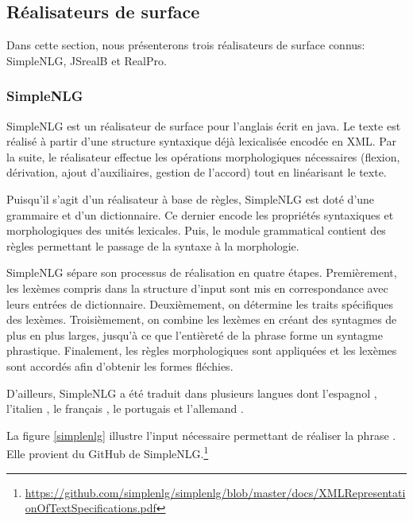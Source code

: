 
\subsection{Réalisateurs de surface}

Dans cette section, nous présenterons trois réalisateurs de surface connus: SimpleNLG, JSrealB et RealPro.

\subsubsection{SimpleNLG}
SimpleNLG \citep{GattSimpleNLGRealisationEngine2009} est un réalisateur de surface pour l'anglais écrit en java. Le texte est réalisé à partir d'une structure syntaxique déjà lexicalisée encodée en XML. Par la suite, le réalisateur effectue les opérations morphologiques nécessaires (flexion, dérivation, ajout d'auxiliaires, gestion de l'accord) tout en linéarisant le texte.

Puisqu'il s'agit d'un réalisateur à base de règles, SimpleNLG est doté d'une grammaire et d'un dictionnaire. Ce dernier encode les propriétés syntaxiques et morphologiques des unités lexicales. Puis, le module grammatical contient des règles permettant le passage de la syntaxe à la morphologie.

SimpleNLG sépare son processus de réalisation en quatre étapes. Premièrement, les lexèmes compris dans la structure d'input sont mis en correspondance avec leurs entrées de dictionnaire. Deuxièmement, on détermine les traits spécifiques des lexèmes. Troisièmement, on combine les lexèmes en créant des syntagmes de plus en plus larges, jusqu'à ce que l'entièreté de la phrase forme un syntagme phrastique. Finalement, les règles morphologiques sont appliquées et les lexèmes sont accordés afin d'obtenir les formes fléchies.

D'ailleurs, SimpleNLG a été traduit dans plusieurs langues dont l'espagnol \citep{RamosSotoAdaptingSimpleNLGSpanish2017}, l'italien \citep{MazzeiSimpleNLGITadaptingSimpleNLG2016}, le français \citep{VaudryAdaptingSimpleNLGBilingual2013}, le portugais \citep{deOliveiraAdaptingSimpleNLGBrazilian2014} et l'allemand \citep{BollmannAdaptingSimpleNLGGerman2011}.

La figure \ref{simplenlg} illustre l'input nécessaire permettant de réaliser la phrase . Elle provient du GitHub de SimpleNLG.\footnote{\url{https://github.com/simplenlg/simplenlg/blob/master/docs/XMLRepresentationOfTextSpecifications.pdf}}

